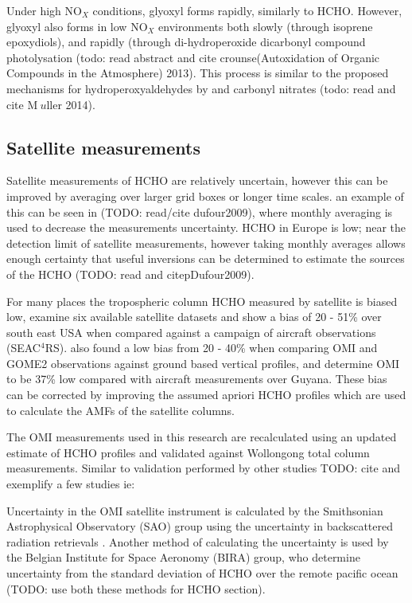     Under high NO$_X$ conditions, glyoxyl forms rapidly, similarly to HCHO.
    However, glyoxyl also forms in low NO$_X$ environments both slowly (through isoprene epoxydiols), and rapidly (through di-hydroperoxide dicarbonyl compound photolysation (todo: read abstract and cite crounse(Autoxidation of Organic Compounds in the Atmosphere) 2013).
    This process is similar to the proposed mechanisms for hydroperoxyaldehydes by \citet{Peeters2014} and carbonyl nitrates (todo: read and cite M$\:{u}$ller 2014).
    
  \subsection{Satellite measurements}
    Satellite measurements of HCHO are relatively uncertain, however this can be improved by averaging over larger grid boxes or longer time scales.
    an example of this can be seen in (TODO: read/cite dufour2009), where monthly averaging is used to decrease the measurements uncertainty.
    HCHO in Europe is low; near the detection limit of satellite measurements, however taking monthly averages allows enough certainty that useful inversions can be determined to estimate the sources of the HCHO (TODO: read and citep{Dufour2009}).
    
    For many places the tropospheric column HCHO measured by satellite is biased low, \citet{Zhu2016} examine six available satellite datasets and show a bias of 20 - 51\% over south east USA when compared against a campaign of aircraft observations (SEAC$^4$RS).
    \citet{DeSmedt2015} also found a low bias from 20 - 40\% when comparing OMI and GOME2 observations against ground based vertical profiles, and \citet{Barkley2013} determine OMI to be 37\% low compared with aircraft measurements over Guyana.
    These bias can be corrected by improving the assumed apriori HCHO profiles which are used to calculate the AMFs of the satellite columns.
    
    The OMI measurements used in this research are recalculated using an updated estimate of HCHO profiles and validated against Wollongong total column measurements. 
    Similar to validation performed by other studies TODO: cite and exemplify a few studies ie: \citet{Zhu2016,Marais2015,Palmer2003} 
    
    Uncertainty in the OMI satellite instrument is calculated by the Smithsonian Astrophysical Observatory (SAO) group using the uncertainty in backscattered radiation retrievals \citep{Abad2015,Abad2016}.
    Another method of calculating the uncertainty is used by the Belgian Institute for Space Aeronomy (BIRA) group, who determine uncertainty from the standard deviation of HCHO over the remote pacific ocean (TODO: use both these methods for HCHO section)\citep{DeSmedt2012,DeSmedt2015}.
